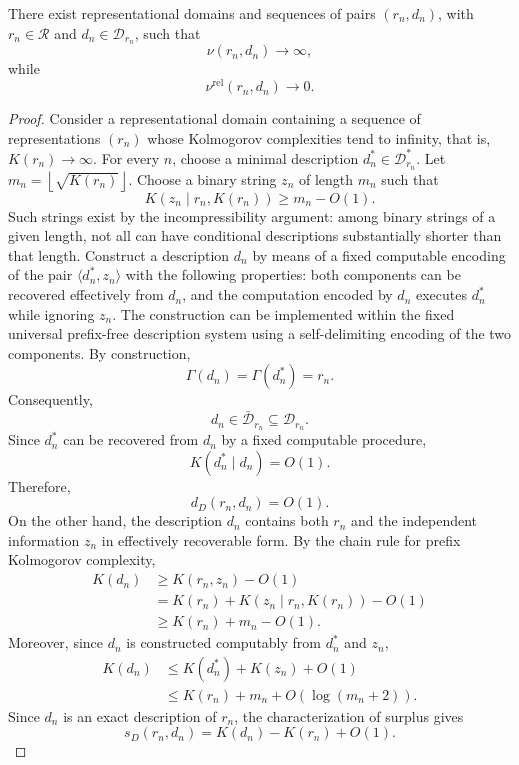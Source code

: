 \begin{proposition}
\label{prop:small_rel_not_small_abs_mismodel}
There exist representational domains and sequences of pairs $(r_n,d_n)$, with $r_n\in\mathcal R$ and $d_n \in \mathcal D_{r_n}$, such that
\[
\nu(r_n,d_n)\to\infty,
\]
while
\[
\nu^{\mathrm{rel}}(r_n,d_n)\to 0.
\]
\end{proposition}
\begin{proof}
Consider a representational domain containing a sequence of representations $(r_n)$ whose Kolmogorov complexities tend to infinity, that is, $K(r_n)\to\infty$. For every $n$, choose a minimal description $d_n^\ast\in\mathcal D_{r_n}^\ast$. Let $m_n=\left\lfloor\sqrt{K(r_n)}\right\rfloor$. Choose a binary string $z_n$ of length $m_n$ such that
\[
K(z_n\mid r_n,K(r_n))\ge m_n-O(1).
\]
Such strings exist by the incompressibility argument: among binary strings of a given length, not all can have conditional descriptions substantially shorter than that length. Construct a description $d_n$ by means of a fixed computable encoding of the pair $\langle d_n^\ast,z_n\rangle$ with the following properties: both components can be recovered effectively from $d_n$, and the computation encoded by $d_n$ executes $d_n^\ast$
while ignoring $z_n$. The construction can be implemented within the fixed universal prefix-free description system using a self-delimiting encoding of the two components. By construction,
\[
\Gamma(d_n)=\Gamma(d_n^\ast)=r_n.
\]
Consequently,
\[
d_n\in\bar{\mathcal D}_{r_n} \subseteq\mathcal D_{r_n}.
\]
Since $d_n^\ast$ can be recovered from $d_n$ by a fixed computable procedure,
\[
K(d_n^\ast\mid d_n)=O(1).
\]
Therefore,
\[
d_D(r_n,d_n)=O(1).
\]
On the other hand, the description $d_n$ contains both $r_n$ and the independent information $z_n$
in effectively recoverable form. By the chain rule for prefix Kolmogorov complexity,
\[
\begin{aligned}
K(d_n)
& \ge K(r_n,z_n)-O(1)\\
& = K(r_n)+K(z_n\mid r_n,K(r_n))-O(1)\\
& \ge K(r_n)+m_n-O(1).
\end{aligned}
\]
Moreover, since $d_n$ is constructed computably from $d_n^\ast$ and $z_n$,
\[
\begin{aligned}
K(d_n)
& \le K(d_n^\ast)+K(z_n)+O(1)\\
& \le K(r_n)+m_n+O(\log(m_n+2)).
\end{aligned}
\]
Since $d_n$ is an exact description of $r_n$, the characterization of surplus gives
\[
s_D(r_n,d_n)=K(d_n)-K(r_n)+O(1).
\]

\end{proof}
